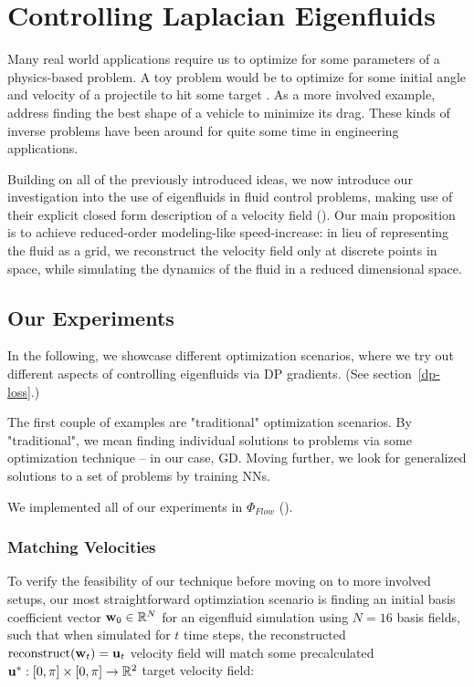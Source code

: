 \chapter{Controlling Laplacian Eigenfluids}
Many real world applications require us to optimize for some parameters of
a physics-based problem. A toy problem would be to optimize for some initial
angle and velocity of a projectile to hit some target . As a more involved example, \cite{MinDrag} address
finding the best shape of a vehicle to minimize its drag. These kinds of
inverse problems have been around for quite some time in engineering
applications.

Building on all of the previously introduced ideas, we now introduce our
investigation into the use of eigenfluids in fluid control problems, making use
of their explicit closed form description of a velocity field (). Our main proposition is to achieve reduced-order modeling-like
speed-increase: in lieu of representing the fluid as a grid, we reconstruct the
velocity field only at discrete points in space, while simulating the dynamics
of the fluid in a reduced dimensional space.

\section{Our Experiments}
In the following, we showcase different optimization scenarios, where we try out
different aspects of controlling eigenfluids via \acf{DP} gradients. (See
section~\ref{dp-loss}.)

The first couple of examples are "traditional" optimization scenarios. By
"traditional", we mean finding individual solutions to problems via some
optimization technique -- in our case, \acf{GD}. Moving further, we look for
generalized solutions to a set of problems by training \acfp{NN}.

We implemented all of our experiments in $\Phi_{Flow}$
(\cite{holl2019pdecontrol}).

\subsection{Matching Velocities}\label{section:matching-velocities}
To verify the feasibility of our technique before moving on to more involved
setups, our most straightforward optimziation scenario is finding an initial
basis coefficient vector $\vb{w}_0 \in \mathbb{R}^N$ for an eigenfluid
simulation using $N=16$ basis fields, such that when simulated for $t$ time
steps, the reconstructed $\text{reconstruct}(\vb{w}_t) = \vb{u}_t$ velocity
field will match some precalculated $\vb{u}^*: [0,\pi]\times[0,\pi] \to
\mathbb{R}^2$ target velocity field:

